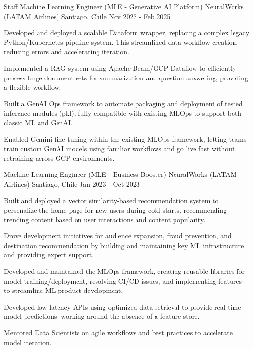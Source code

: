 \cventry
{Staff Machine Learning Engineer (MLE - Generative AI Platform)}
{NeuralWorks (LATAM Airlines)}
{Santiago, Chile}
{Nov 2023 - Feb 2025}
{
\begin{cvitems}
    \item Developed and deployed a scalable Dataform wrapper, replacing a complex legacy Python/Kubernetes pipeline system. This streamlined data workflow creation, reducing errors and accelerating iteration.
    \item Implemented a RAG system using Apache Beam/GCP Dataflow to efficiently process large document sets for summarization and question answering, providing a flexible workflow.
    \item Built a GenAI Ops framework to automate packaging and deployment of tested inference modules (pkl), fully compatible with existing MLOps to support both classic ML and GenAI.
    \item Enabled Gemini fine-tuning within the existing MLOps framework, letting teams train custom GenAI models using familiar workflows and go live fast without retraining across GCP environments.
\end{cvitems}
}

\cventry
{Machine Learning Engineer (MLE - Business Booster)}
{NeuralWorks (LATAM Airlines)}
{Santiago, Chile}
{Jan 2023 - Oct 2023}   
{
\begin{cvitems}
    \item Built and deployed a vector similarity-based recommendation system to personalize the home page for new users during cold starts, recommending trending content based on user interactions and content popularity.
    \item Drove development initiatives for audience expansion, fraud prevention, and destination recommendation by building and maintaining key ML infrastructure and providing expert support.
    \item Developed and maintained the MLOps framework, creating reusable libraries for model training/deployment, resolving CI/CD issues, and implementing features to streamline ML product development.
    \item Developed low-latency APIs using optimized data retrieval to provide real-time model predictions, working around the absence of a feature store.
    \item Mentored Data Scientists on agile workflows and best practices to accelerate model iteration.
\end{cvitems}
}


